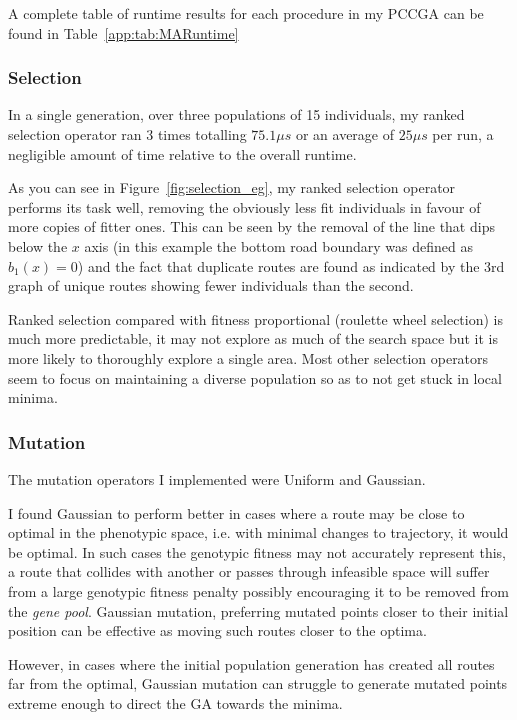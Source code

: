 A complete table of runtime results for each procedure in my PCCGA can be found in Table~\ref{app:tab:MARuntime}

\subsubsection{Selection}

In a single generation, over three populations of 15 individuals, my ranked selection operator ran 3 times totalling $75.1\mu s$ or an average of $25 \mu s$ per run, a negligible amount of time relative to the overall runtime.

As you can see in Figure~\ref{fig:selection_eg}, my ranked selection operator performs its task well, removing the obviously less fit individuals in favour of more copies of  fitter ones. This can be seen by the removal of the line that dips below the $x$ axis (in this example the bottom road boundary was defined as $b_{1}(x) = 0 $) and the fact that duplicate routes are found as indicated by the 3rd graph of unique routes showing fewer individuals than the second.

Ranked selection compared with fitness proportional (roulette wheel selection) is much more predictable, it may not explore as much of the search space but it is more likely to thoroughly explore a single area. Most other selection operators seem to focus on maintaining a diverse population so as to not get stuck in local minima.

\subsubsection{Mutation}

The mutation operators I implemented were Uniform and Gaussian.

I found Gaussian to perform better in cases where a route may be close to optimal in the phenotypic space, i.e. with minimal changes to trajectory, it would be optimal. In such cases the genotypic fitness may not accurately represent this, a route that collides with another or passes through infeasible space will suffer from a large genotypic fitness penalty possibly encouraging it to be removed from the \textit{gene pool}. Gaussian mutation, preferring mutated points closer to their initial position can be effective as moving such routes closer to the optima.

However, in cases where the initial population generation has created all routes far from the optimal, Gaussian mutation can struggle to generate mutated points extreme enough to direct the GA towards the minima.

